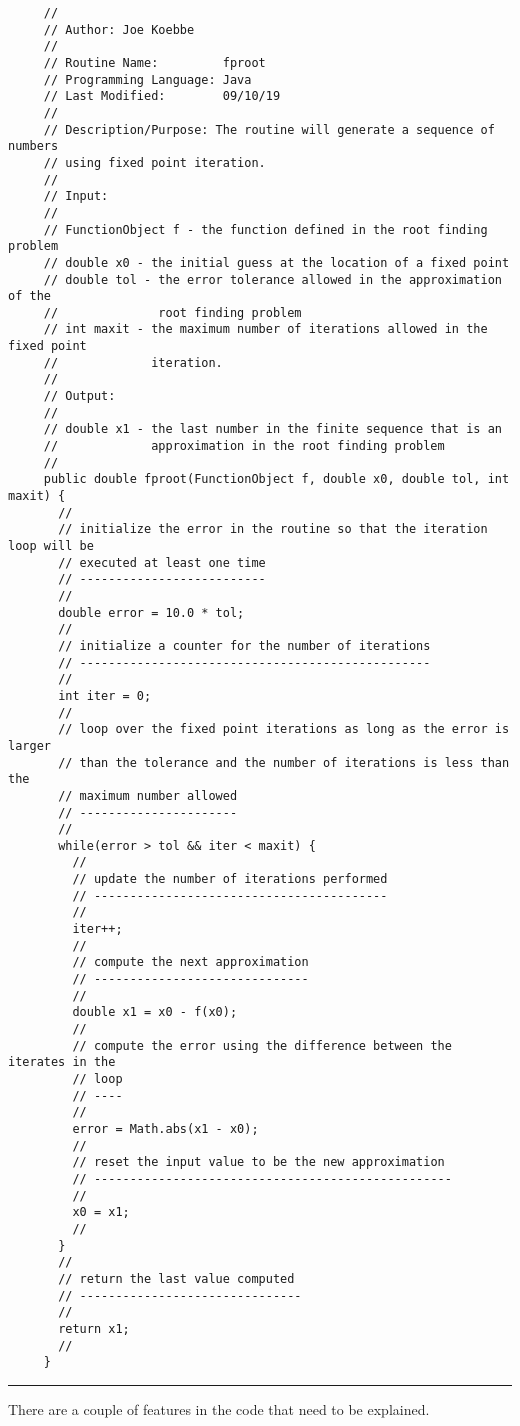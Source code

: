 \documentclass[10pt,fleqn]{article}
\begin{document}
\begin{verbatim}
     //
     // Author: Joe Koebbe
     //
     // Routine Name:         fproot
     // Programming Language: Java
     // Last Modified:        09/10/19
     //
     // Description/Purpose: The routine will generate a sequence of numbers
     // using fixed point iteration.
     //
     // Input:
     //
     // FunctionObject f - the function defined in the root finding problem
     // double x0 - the initial guess at the location of a fixed point
     // double tol - the error tolerance allowed in the approximation of the
     //              root finding problem
     // int maxit - the maximum number of iterations allowed in the fixed point
     //             iteration.
     //
     // Output:
     //
     // double x1 - the last number in the finite sequence that is an
     //             approximation in the root finding problem
     //
     public double fproot(FunctionObject f, double x0, double tol, int maxit) {
       //
       // initialize the error in the routine so that the iteration loop will be
       // executed at least one time
       // --------------------------
       //
       double error = 10.0 * tol;
       //
       // initialize a counter for the number of iterations
       // -------------------------------------------------
       //
       int iter = 0;
       //
       // loop over the fixed point iterations as long as the error is larger
       // than the tolerance and the number of iterations is less than the
       // maximum number allowed
       // ----------------------
       //
       while(error > tol && iter < maxit) {
         //
         // update the number of iterations performed
         // -----------------------------------------
         //
         iter++;
         //
         // compute the next approximation
         // ------------------------------
         //
         double x1 = x0 - f(x0);
         //
         // compute the error using the difference between the iterates in the
         // loop
         // ----
         //
         error = Math.abs(x1 - x0);
         //
         // reset the input value to be the new approximation
         // --------------------------------------------------
         //
         x0 = x1;
         //
       }
       //
       // return the last value computed
       // -------------------------------
       //
       return x1;
       //
     }

\end{verbatim}
\vskip0.1in\hrule\vskip0.1in
\noindent
There are a couple of features in the code that need to be explained.
\end{document}
